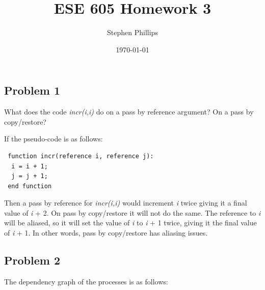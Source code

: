 \documentclass[english]{article}
\title{ESE 605 Homework 3}
\author{Stephen Phillips}
\date{\today }
\begin{document}
\maketitle
\subsection*{Problem 1}
What does the code \textit{incr(i,i)} do on a pass by reference argument? On a pass by copy/restore?

If the pseudo-code is as follows:
\begin{lstlisting}
 function incr(reference i, reference j):
  i = i + 1;
  j = j + 1;
 end function
\end{lstlisting}

Then a pass by reference for \textit{incr(i,i)} would increment \textit{i} twice giving it a final
value of \textit{i} + 2. %
On pass by copy/restore it will not do the same. The reference to \textit{i} will be aliased, so it will set the value of \textit{i} to 
\textit{i} + 1 twice, giving it the final value of \textit{i} + 1. In other words, pass by copy/restore has aliasing issues.

\subsection*{Problem 2}
The dependency graph of the processes is as follows:
\begin{figure}[H]
\end{figure}
\end{document}
